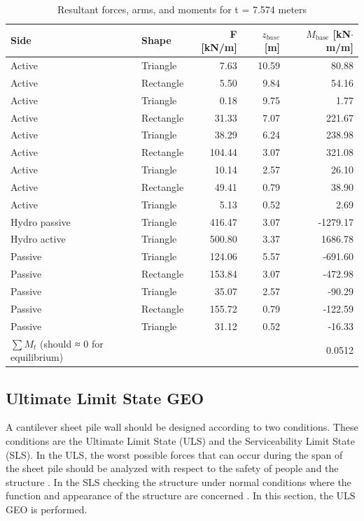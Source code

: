 \begin{table}[H]
  \centering
  \caption{Resultant forces, arms, and moments for t = 7.574 meters}
  \label{tab:forces_arms_moments_9713}
  \small
  \setlength{\tabcolsep}{8pt}
  \renewcommand{\arraystretch}{1.15}
  \begin{tabular}{@{}l l r r r@{}}
    \toprule
    Side & Shape &
    F [kN/m] & $z_{base}$ [m] &
    $M_{\text{base}}$ [kN$\cdot$m/m] \\
    \midrule
    Active  & Triangle  &   7.63  & 10.59 &  80.88 \\
    Active  & Rectangle &   5.50  &  9.84 &  54.16 \\
    Active  & Triangle  &   0.18  &  9.75 &   1.77 \\
    Active  & Rectangle &  31.33  &  7.07 & 221.67 \\
    Active  & Triangle  &  38.29  &  6.24 & 238.98 \\
    Active  & Rectangle & 104.44  &  3.07 & 321.08 \\
    Active  & Triangle  &  10.14  &  2.57 &  26.10 \\
    Active  & Rectangle &  49.41  &  0.79 &  38.90 \\
    Active  & Triangle  &   5.13  &  0.52 &   2.69 \\
    Hydro passive   & Triangle  & 416.47  &  3.07 & -1279.17 \\
    Hydro active    & Triangle  & 500.80  &  3.37 & 1686.78 \\
    Passive & Triangle  & 124.06  &  5.57 &  -691.60 \\
    Passive & Rectangle & 153.84  &  3.07 &  -472.98 \\
    Passive & Triangle  &  35.07  &  2.57 &   -90.29 \\
    Passive & Rectangle & 155.72  &  0.79 &  -122.59 \\
    Passive & Triangle  &  31.12  &  0.52 &   -16.33 \\
    \midrule
    $\sum M_{t}$ (should ≈ 0 for equilibrium) & & & & 0.0512 \\
    \bottomrule
  \end{tabular}
\end{table}

\subsection{Ultimate Limit State GEO}

A cantilever sheet pile wall should be designed according to two conditions. These conditions are the Ultimate Limit State (ULS) and the Serviceability Limit State (SLS). In the ULS, the worst possible forces that can occur during the span of the sheet pile should be analyzed with respect to the safety of people and the structure \autocite{baxterPilingHandbook2022}. In the SLS checking the structure under normal conditions where the function and appearance of the structure are concerned \autocite{baxterPilingHandbook2022}. In this section, the ULS GEO is performed.

